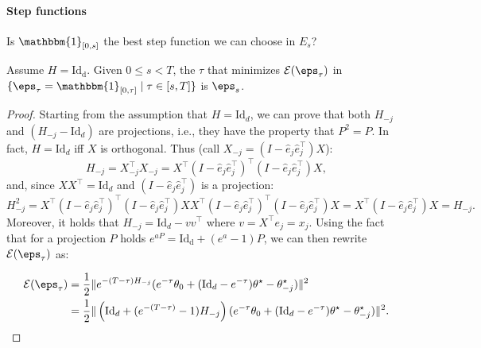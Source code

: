 \paragraph{Step functions} Is $\mathbbm{1}_{[0,s]}$ the best step function we can choose in $E_s$?

\begin{lemma}\label{le:step_eps}
  Assume $H=\mathrm{Id_d}$. 
  Given $0\le s < T$, the $\tau$ that minimizes $\mathcal{E}(\eps_\tau)$ in $\{\eps_\tau=\mathbbm{1}_{[0,\tau]} \mid \tau\in[s,T]\}$ is $\eps_s$.
\end{lemma}

\begin{proof}
Starting from the assumption that $H=\mathrm{Id}_d$, we can prove that both $H_{-j}$ and $(H_{-j}-\mathrm{Id}_d)$ are projections, i.e., they have the property that $P^2=P$.
In fact, $H=\mathrm{Id}_d$ iff $X$ is orthogonal. Thus (call $X_{-j}=(I-\hat e_j \hat e_j^\top)X$):
\begin{equation*}
  H_{-j} = X_{-j}^\top X_{-j} = X^\top(I-\hat e_j \hat e_j^\top)^\top(I-\hat e_j \hat e_j^\top)X ,
\end{equation*}
and, since $X X^\top = \mathrm{Id}_d$ and $(I-\hat e_j  \hat e_j^\top)$ is a projection:
\begin{equation*}
  H_{-j}^2 = X^\top(I-\hat e_j \hat e_j^\top)^\top(I-\hat e_j \hat e_j^\top)X X^\top(I-\hat e_j \hat e_j^\top)^\top(I-\hat e_j \hat e_j^\top)X = X^\top (I-\hat e_j \hat e_j^\top) X = H_{-j} .
\end{equation*}
Moreover, it holds that $H_{-j}=\mathrm{Id}_d- v v^\top$ where $v=X^\top e_j = x_j$.
Using the fact that for a projection $P$ holds $e^{a P}=\mathrm{Id_d}+(e^a-1)P$, we can then rewrite $\mathcal{E}(\eps_\tau)$ as:

\begin{equation*}
  \begin{aligned}
    \mathcal{E}(\eps_\tau) &= \frac12\|e^{-(T-\tau)H_{-j}} (e^{-\tau} \theta_0 +(\mathrm{Id}_d-e^{-\tau})\theta^\star-\theta^\star_{-j}) \|^2 \\
    &= \frac12 \|\left(\mathrm{Id}_d + (e^{-(T-\tau)}-1) H_{-j} \right) (e^{-\tau} \theta_0 +(\mathrm{Id}_d-e^{-\tau})\theta^\star-\theta^\star_{-j})\|^2 .
  \end{aligned}
\end{equation*}


\end{proof}
